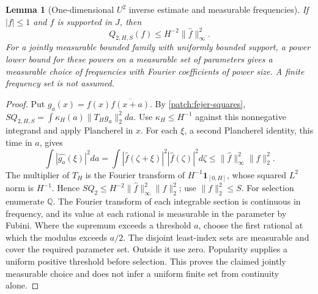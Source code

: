 \documentclass[11pt]{article}
\newtheorem{lemma}[lemma]{Lemma}
\theoremstyle{definition}
\begin{document}
\begin{lemma}[One-dimensional $U^2$ inverse estimate and measurable frequencies]
\label{patch:u2-fourier-selection}
If $|f|\leq1$ and $f$ is supported in $J$, then
\[
 Q_{2,H,S}(f)\leq H^{-2}\|\widehat f\|_\infty^2.
\]
For a jointly measurable bounded family with uniformly bounded support, a power lower bound
for these powers on a measurable set of parameters gives a measurable choice of frequencies
with Fourier coefficients of power size.  A finite frequency set is not assumed.
\end{lemma}
\begin{proof}
Put $g_a(x)=f(x)\overline{f(x+a)}$.  By \cref{patch:fejer-squares},
$SQ_{2,H,S}=\int\kappa_H(a)\|T_Hg_a\|_2^2da$.
Use $\kappa_H\leq H^{-1}$ against this nonnegative integrand and apply Plancherel in $x$.
For each $\xi$, a second Plancherel identity, this time in $a$, gives
\[
 \int|\widehat{g_a}(\xi)|^2da
    =\int|\widehat f(\zeta+\xi)|^2|\widehat f(\zeta)|^2d\zeta
    \leq\|\widehat f\|_\infty^2\|f\|_2^2.
\]
The multiplier of $T_H$ is the Fourier transform of $H^{-1}\mathbf1_{[0,H]}$, whose squared
$L^2$ norm is $H^{-1}$.  Hence $SQ_2\leq H^{-2}\|\widehat f\|_\infty^2\|f\|_2^2$;
use $\|f\|_2^2\leq S$.
For selection enumerate $\mathbb Q$.  The Fourier transform of each integrable section is
continuous in frequency, and its value at each rational is measurable in the parameter by
Fubini.  Where the supremum exceeds a threshold $a$, choose the first rational at which the
modulus exceeds $a/2$.  The disjoint least-index sets are measurable and cover the required
parameter set.  Outside it use zero.  Popularity supplies a uniform positive threshold
before selection.  This proves the claimed jointly measurable choice and does not infer a
uniform finite set from continuity alone.
\end{proof}
\end{document}
